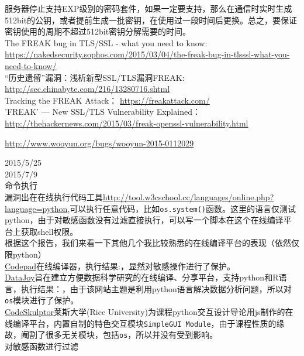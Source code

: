 \documentclass{leptc}
\begin{document}
     服务器停止支持EXP级别的密码套件，如果一定要支持，那么在通信时实时生成512bit的公钥，或者提前生成一批密钥，在使用过一段时间后更换。总之，要保证密钥使用的周期不超过512bit密钥分解需要的时间。\\
      The FREAK bug in TLS/SSL - what you need to know: \url{https://nakedsecurity.sophos.com/2015/03/04/the-freak-bug-in-tlsssl-what-you-need-to-know/} \\
     “历史遗留”漏洞：浅析新型SSL/TLS漏洞FREAK: \url{http://sec.chinabyte.com/216/13280716.shtml}\\
     Tracking the FREAK Attack： \url{https://freakattack.com/}  \\
     'FREAK' — New SSL/TLS Vulnerability Explained：\url{http://thehackernews.com/2015/03/freak-openssl-vulnerability.html}\\
    
    \begin{center}
    	\url{http://www.wooyun.org/bugs/wooyun-2015-0112029}
    \end{center}
     2015/5/25 \\
     2015/7/9 \\
     命令执行\\
     漏洞出在在线执行代码工具\url{http://tool.w3cschool.cc/languages/online.php?language=python},可以执行任意代码，比如\texttt{os.system()}函数。这里的语言仅测试python，由于对敏感函数没有过滤直接执行，可以写一个脚本在这个在线编译平台上获取shell权限。\\
     根据这个报告，我们来看一下其他几个我比较熟悉的在线编译平台的表现（依然仅限python）\\
     \href{http://codepad.org/8wOAh1mZ}{Codepad}在线编译器，执行结果:，显然对敏感操作进行了保护。\\
     \href{https://www.getdatajoy.com/}{DataJoy}旨在建立方便数据科学研究的在线编译、分享平台，支持python和R语言，执行结果：，由于该网站主题是利用python语言解决数据分析问题，所以对\texttt{os}模块进行了保护。 \\
     \href{http://www.codeskulptor.org/#user40_5ruLoi0n0D_0.py}{CodeSkulptor}莱斯大学(Rice University)为课程python交互设计导论用js制作的在线编译平台，内置自制的特色交互模块\texttt{SimpleGUI Module}，由于课程性质的缘故，阉割了很多无关模块，包括\texttt{os}，所以并没有受到影响。\\
     对敏感函数进行过滤 \\
    
    
\end{document}
